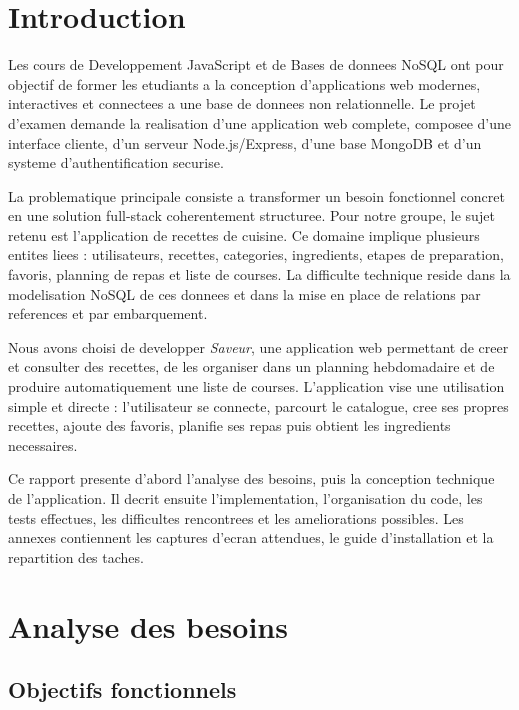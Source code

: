 \documentclass[12pt,a4paper]{report}
\begin{document}
\tableofcontents
\listoffigures
\listoftables

\chapter{Introduction}

Les cours de Developpement JavaScript et de Bases de donnees NoSQL ont pour objectif de former les etudiants a la conception d'applications web modernes, interactives et connectees a une base de donnees non relationnelle. Le projet d'examen demande la realisation d'une application web complete, composee d'une interface cliente, d'un serveur Node.js/Express, d'une base MongoDB et d'un systeme d'authentification securise.

La problematique principale consiste a transformer un besoin fonctionnel concret en une solution full-stack coherentement structuree. Pour notre groupe, le sujet retenu est l'application de recettes de cuisine. Ce domaine implique plusieurs entites liees : utilisateurs, recettes, categories, ingredients, etapes de preparation, favoris, planning de repas et liste de courses. La difficulte technique reside dans la modelisation NoSQL de ces donnees et dans la mise en place de relations par references et par embarquement.

Nous avons choisi de developper \textit{Saveur}, une application web permettant de creer et consulter des recettes, de les organiser dans un planning hebdomadaire et de produire automatiquement une liste de courses. L'application vise une utilisation simple et directe : l'utilisateur se connecte, parcourt le catalogue, cree ses propres recettes, ajoute des favoris, planifie ses repas puis obtient les ingredients necessaires.

Ce rapport presente d'abord l'analyse des besoins, puis la conception technique de l'application. Il decrit ensuite l'implementation, l'organisation du code, les tests effectues, les difficultes rencontrees et les ameliorations possibles. Les annexes contiennent les captures d'ecran attendues, le guide d'installation et la repartition des taches.

\chapter{Analyse des besoins}

\section{Objectifs fonctionnels}
\end{document}
